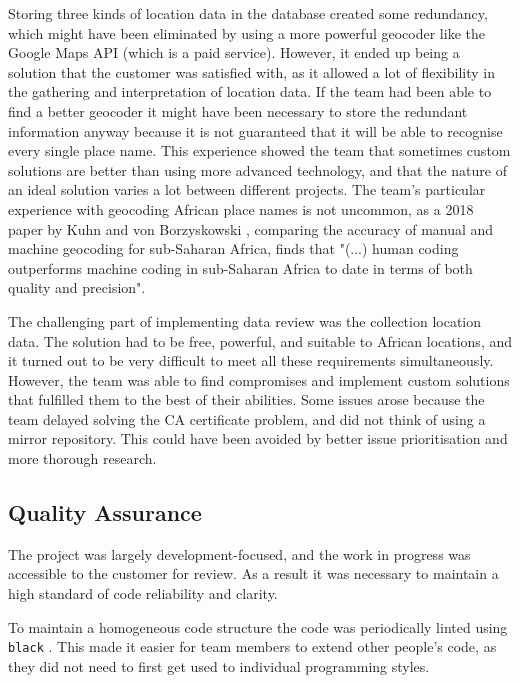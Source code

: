 \documentclass{l3proj}
\begin{document}
Storing three kinds of location data in the database created some redundancy, which might have been eliminated by using a more powerful geocoder like the Google Maps API (which is a paid service). However, it ended up being a solution that the customer was satisfied with, as it allowed a lot of flexibility in the gathering and interpretation of location data. If the team had been able to find a better geocoder it might have been necessary to store the redundant information anyway because it is not guaranteed that it will be able to recognise every single place name.
This experience showed the team that sometimes custom solutions are better than using more advanced technology, and that the nature of an ideal solution varies a lot between different projects.
The team's particular experience with geocoding African place names is not uncommon, as a 2018 paper by Kuhn and von Borzyskowski \cite{africaGeocode}, comparing the accuracy of manual and machine geocoding for sub-Saharan Africa, finds that "(...) human coding outperforms machine coding in sub-Saharan Africa to date in terms of both quality and precision".

The challenging part of implementing data review was the collection location data. The solution had to be free, powerful, and suitable to African locations, and it turned out to be very difficult to meet all these requirements simultaneously. However, the team was able to find compromises and implement custom solutions that fulfilled them to the best of their abilities. Some issues arose because the team delayed solving the CA certificate problem, and did not think of using a mirror repository. This could have been avoided by better issue prioritisation and more thorough research.



\subsection{Quality Assurance}
\label{subsec:qa}
The project was largely development-focused, and the work in progress was accessible to the customer for review. As a result it was necessary to maintain a high standard of code reliability and clarity. 

To maintain a homogeneous code structure the code was periodically linted using \texttt{black} \cite{black}. This made it easier for team members to extend other people's code, as they did not need to first get used to individual programming styles.
\end{document}
